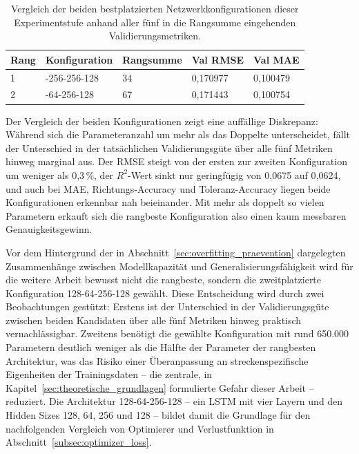 \begin{table}[h]
    \centering
    \small
    \caption[Beste Netzwerkkonfigurationen]{Vergleich der beiden bestplatzierten Netzwerkkonfigurationen dieser Experimentstufe anhand aller fünf in die Rangsumme eingehenden Validierungsmetriken.}
    \label{tab:dimensionierung_top2}
    \begin{tabularx}{\textwidth}{@{} l >{\raggedright\arraybackslash}p{3.5cm} X X X @{}}
        \toprule
        \textbf{Rang} & \textbf{Konfiguration} & \textbf{Rangsumme} & \textbf{Val RMSE} & \textbf{Val MAE} \\
        \midrule
        1 & 256-256-256-128 & 34 & 0,170977 & 0,100479 \\
        2 & 128-64-256-128  & 67 & 0,171443 & 0,100754 \\
        \bottomrule
    \end{tabularx}
\end{table}

Der Vergleich der beiden Konfigurationen zeigt eine auffällige Diskrepanz: Während sich die Parameteranzahl um mehr als das Doppelte unterscheidet, fällt der Unterschied in der tatsächlichen Validierungsgüte über alle fünf Metriken hinweg marginal aus. Der \gls{RMSE} steigt von der ersten zur zweiten Konfiguration um weniger als 0,3\,\%, der $R^2$-Wert sinkt nur geringfügig von 0,0675 auf 0,0624, und auch bei \gls{MAE}, Richtungs-Accuracy und Toleranz-Accuracy liegen beide Konfigurationen erkennbar nah beieinander. Mit mehr als doppelt so vielen Parametern erkauft sich die rangbeste Konfiguration also einen kaum messbaren Genauigkeitsgewinn.

Vor dem Hintergrund der in Abschnitt~\ref{sec:overfitting_praevention} dargelegten Zusammenhänge zwischen Modellkapazität und Generalisierungsfähigkeit wird für die weitere Arbeit bewusst nicht die rangbeste, sondern die zweitplatzierte Konfiguration 128-64-256-128 gewählt. Diese Entscheidung wird durch zwei Beobachtungen gestützt: Erstens ist der Unterschied in der Validierungsgüte zwischen beiden Kandidaten über alle fünf Metriken hinweg praktisch vernachlässigbar. Zweitens benötigt die gewählte Konfiguration mit rund 650.000 Parametern deutlich weniger als die Hälfte der Parameter der rangbesten Architektur, was das Risiko einer Überanpassung an streckenspezifische Eigenheiten der Trainingsdaten -- die zentrale, in Kapitel~\ref{sec:theoretische_grundlagen} formulierte Gefahr dieser Arbeit -- reduziert. Die Architektur 128-64-256-128 -- ein \gls{LSTM} mit vier Layern und den Hidden Sizes 128, 64, 256 und 128 -- bildet damit die Grundlage für den nachfolgenden Vergleich von Optimierer und Verlustfunktion in Abschnitt~\ref{subsec:optimizer_loss}.

